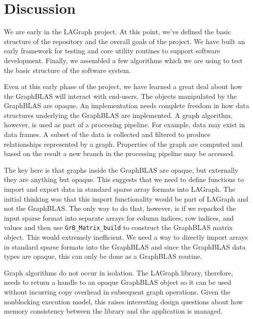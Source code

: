 \section{Discussion}
\label{sec:disc}

We are early in the LAGraph project.  At this point, we've defined the basic structure of the
repository and the overall goals of the project. We have built an early framework for testing
and core utility routines to support software development.  Finally, we assembled a few algorithms which we
are using to test the basic structure of the software system.

Even at this early phase of the project, we have learned a great deal about how the GraphBLAS
will interact with end-users.  The objects manipulated by the GraphBLAS are opaque.  An implementation
needs complete freedom in how data structures underlying the GraphBLAS are implemented.  
A graph algorithm, however, is used as part of a processing pipeline.  For example, data may
exist in data frames.  A subset of the data is collected and filtered to produce relationships
represented by a graph. Properties of the graph are computed and based on the result 
a new branch in the processing pipeline may be accessed.  

The key here is that graphs inside the GraphBLAS are opaque, but externally they are 
anything but opaque.  This suggests that we need to define functions to import and export 
data in standard sparse array formats into LAGraph.   The initial thinking was that this
import functionality would be part of LAGraph and not the GraphBLAS.  The only way to 
do that, however, is if we repacked the input sparse format into separate arrays for column 
indices, row indices, and values and then use \verb'GrB_Matrix_build' to construct the GraphBLAS
matrix object.  This would extremely inefficient.  We need a way to directly import arrays 
in standard sparse formats into the GraphBLAS and since the GraphBLAS data types are
opaque, this can only be done as a GraphBLAS routine.  

Graph algorithms do not occur in isolation.   The LAGraph library, therefore, needs to 
return a handle to an opaque GraphBLAS object so it can be used without incurring copy overhead
in subsequent graph operations.  Given the nonblocking execution model, this raises interesting
design questions about how memory consistency between the library and the application is
managed.  


